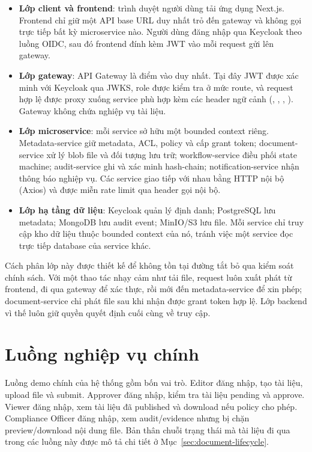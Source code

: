 \begin{itemize}
  \item \textbf{Lớp client và frontend}: trình duyệt người dùng tải ứng dụng Next.js. Frontend chỉ giữ một API base URL duy nhất trỏ đến gateway và không gọi trực tiếp bất kỳ microservice nào. Người dùng đăng nhập qua Keycloak theo luồng OIDC, sau đó frontend đính kèm JWT vào mỗi request gửi lên gateway.
  \item \textbf{Lớp gateway}: API Gateway là điểm vào duy nhất. Tại đây JWT được xác minh với Keycloak qua JWKS, role được kiểm tra ở mức route, và request hợp lệ được proxy xuống service phù hợp kèm các header ngữ cảnh (, , , ). Gateway không chứa nghiệp vụ tài liệu.
  \item \textbf{Lớp microservice}: mỗi service sở hữu một bounded context riêng. Metadata-service giữ metadata, ACL, policy và cấp grant token; document-service xử lý blob file và đối tượng lưu trữ; workflow-service điều phối state machine; audit-service ghi và xác minh hash-chain; notification-service nhận thông báo nghiệp vụ. Các service giao tiếp với nhau bằng HTTP nội bộ (Axios) và được miễn rate limit qua header gọi nội bộ.
  \item \textbf{Lớp hạ tầng dữ liệu}: Keycloak quản lý định danh; PostgreSQL lưu metadata; MongoDB lưu audit event; MinIO/S3 lưu file. Mỗi service chỉ truy cập kho dữ liệu thuộc bounded context của nó, tránh việc một service đọc trực tiếp database của service khác.
\end{itemize}

Cách phân lớp này được thiết kế để không tồn tại đường tắt bỏ qua kiểm soát chính sách. Với một thao tác nhạy cảm như tải file, request luôn xuất phát từ frontend, đi qua gateway để xác thực, rồi mới đến metadata-service để xin phép; document-service chỉ phát file sau khi nhận được grant token hợp lệ. Lớp backend vì thế luôn giữ quyền quyết định cuối cùng về truy cập.

\section{Luồng nghiệp vụ chính}
\label{sec:business-flow}

Luồng demo chính của hệ thống gồm bốn vai trò. Editor đăng nhập, tạo tài liệu, upload file và submit. Approver đăng nhập, kiểm tra tài liệu pending và approve. Viewer đăng nhập, xem tài liệu đã published và download nếu policy cho phép. Compliance Officer đăng nhập, xem audit/evidence nhưng bị chặn preview/download nội dung file. Bản thân chuỗi trạng thái mà tài liệu đi qua trong các luồng này được mô tả chi tiết ở Mục~\ref{sec:document-lifecycle}.

